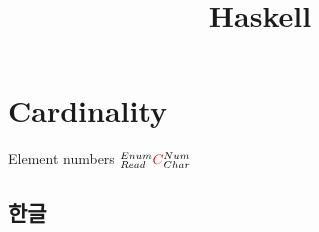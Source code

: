\documentclass{article}
\title{Haskell}
\theoremstyle{definition}
\begin{document}
\maketitle

\section{Cardinality}
  Element numbers
  $^{Enum}_{Read}{\huge \color{red}{C}}^{Num}_{Char}$

\subsection{한글}
\end{document}
